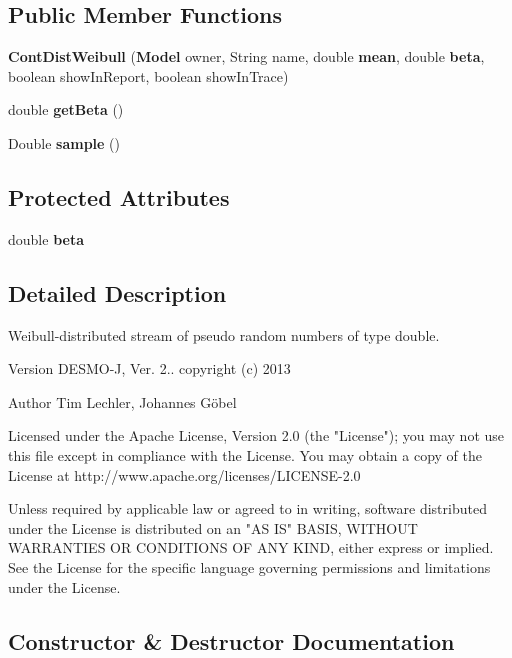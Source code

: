 \subsection*{Public Member Functions}
\begin{DoxyCompactItemize}
\item 
{\bf Cont\-Dist\-Weibull} ({\bf Model} owner, String name, double {\bf mean}, double {\bf beta}, boolean show\-In\-Report, boolean show\-In\-Trace)
\item 
double {\bf get\-Beta} ()
\item 
Double {\bf sample} ()
\end{DoxyCompactItemize}
\subsection*{Protected Attributes}
\begin{DoxyCompactItemize}
\item 
double {\bf beta}
\end{DoxyCompactItemize}


\subsection{Detailed Description}
Weibull-\/distributed stream of pseudo random numbers of type double.

\begin{DoxyVersion}{Version}
D\-E\-S\-M\-O-\/\-J, Ver. 2.. copyright (c) 2013 
\end{DoxyVersion}
\begin{DoxyAuthor}{Author}
Tim Lechler, Johannes G\"{o}bel \begin{DoxyVerb}    Licensed under the Apache License, Version 2.0 (the "License"); you
    may not use this file except in compliance with the License. You may
    obtain a copy of the License at
    http://www.apache.org/licenses/LICENSE-2.0

    Unless required by applicable law or agreed to in writing, software
    distributed under the License is distributed on an "AS IS" BASIS,
    WITHOUT WARRANTIES OR CONDITIONS OF ANY KIND, either express or
    implied. See the License for the specific language governing
    permissions and limitations under the License.\end{DoxyVerb}
 
\end{DoxyAuthor}


\subsection{Constructor \& Destructor Documentation}
